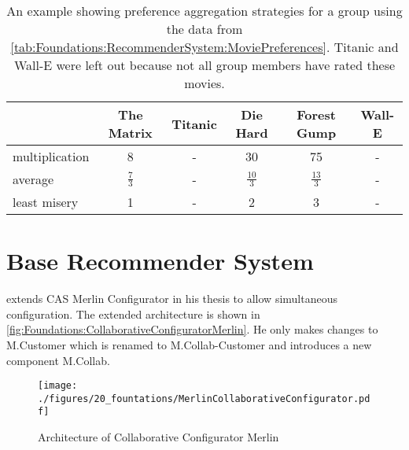 \begin{table}
    \centering    
    \begin{tabular}{ l | c | c | c | c | c }
        & The Matrix & Titanic & Die Hard & Forest Gump & Wall-E \\ \hline
         multiplication  & 8 & - & 30 & 75 & - \\
         average  & $\frac{7}{3}$ & - & $\frac{10}{3}$ & $\frac{13}{3}$ & - \\
         least misery  & 1 & - & 2 & 3 & - \\
    \end{tabular}
    \caption{An example showing preference aggregation strategies for a group using the data from \autoref{tab:Foundations:RecommenderSystem:MoviePreferences}. Titanic and Wall-E were left out because not all group members have rated these movies.}
    
    \label{tab:Foundations:RecommenderSystem:AggregationStrategy}
\end{table}


\section{Base Recommender System}
\label{sec:Foundations:BaseSystem}

\citeauthor{raabKollaborativeProduktkonfigurationEchtzeit2019} \cite{raabKollaborativeProduktkonfigurationEchtzeit2019} extends CAS Merlin Configurator in his thesis to allow simultaneous configuration. The extended architecture is shown in \autoref{fig:Foundations:CollaborativeConfiguratorMerlin}.
He only makes changes to M.Customer which is renamed to M.Collab-Customer and introduces a new component M.Collab.

\begin{figure}
    \centering
    \texttt{[image: ./figures/20\_fountations/MerlinCollaborativeConfigurator.pdf]}
    \caption{Architecture of Collaborative Configurator Merlin \cite[Fig. 4.3]{raabKollaborativeProduktkonfigurationEchtzeit2019}}
    \label{fig:Foundations:CollaborativeConfiguratorMerlin}
\end{figure}

